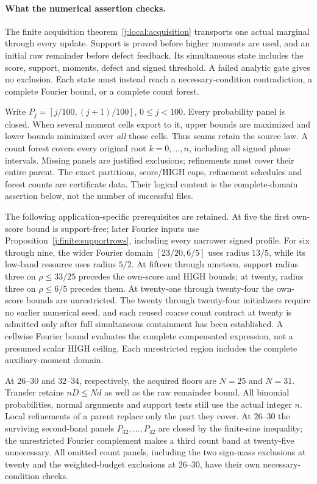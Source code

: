 \paragraph{What the numerical assertion checks.}
The finite acquisition theorem~\ref{j:local:acquisition} transports
one actual marginal through every update. Support is proved before
higher moments are used, and an initial raw remainder before defect
feedback. Its simultaneous state includes the score, support, moments,
defect and signed threshold. A failed analytic gate gives no exclusion.
Each state must instead reach a necessary-condition contradiction, a
complete Fourier bound, or a complete count forest.

Write $P_j=[j/100,(j+1)/100]$, $0\le j<100$.
Every probability panel is closed. When several moment cells export
to it, upper bounds are maximized and lower bounds minimized over
\emph{all} those cells. Thus seams retain the source law. A count
forest covers every original root $k=0,\ldots,n$, including all signed
phase intervals. Missing panels are justified exclusions; refinements
must cover their entire parent. The exact partitions, score/HIGH caps,
refinement schedules and forest counts are certificate data. Their
logical content is the complete-domain assertion below, not the number
of successful files.

The following application-specific prerequisites are retained.
At five the first own-score bound is support-free; later Fourier inputs
use Proposition~\ref{j:finite:supportrows}, including every narrower
signed profile. For six through nine, the wider Fourier domain
$[23/20,6/5]$ uses radius $13/5$, while its low-band resource uses
radius $5/2$. At fifteen through nineteen, support radius three on
$\rho\le33/25$ precedes the own-score and HIGH bounds; at twenty,
radius three on $\rho\le6/5$ precedes them. At twenty-one through
twenty-four the own-score bounds are unrestricted. The twenty through
twenty-four initializers require no earlier numerical seed, and each
reused coarse count contract at twenty is admitted only after full
simultaneous containment has been established. A cellwise Fourier
bound evaluates the complete compensated expression, not a presumed
scalar HIGH ceiling. Each unrestricted region includes the complete
auxiliary-moment domain.

At $26$--$30$ and $32$--$34$, respectively, the acquired floors are
$N=25$ and $N=31$. Transfer retains $nD\le Nd$ as well as the raw
remainder bound. All binomial probabilities, normal arguments and
support tests still use the actual integer $n$. Local refinements of
a parent replace only the part they cover. At $26$--$30$ the surviving
second-band panels $P_{32},\ldots,P_{42}$ are closed by the finite-sine
inequality; the unrestricted Fourier complement makes a third count
band at twenty-five unnecessary. All omitted count panels, including
the two sign-mass exclusions at twenty and the weighted-budget
exclusions at $26$--$30$, have their own necessary-condition checks.

